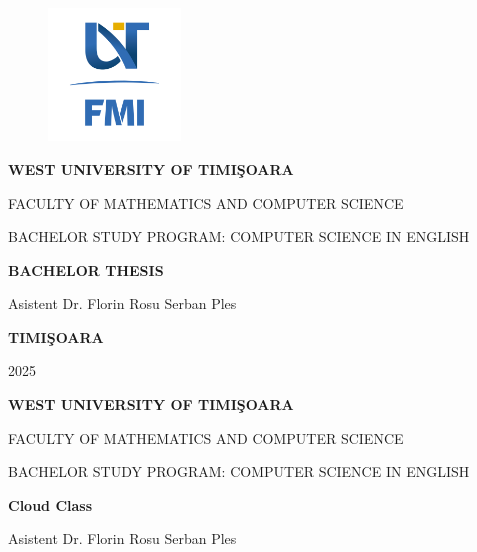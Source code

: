 \documentclass[12pt,a4paper]{book}
\theoremstyle{definition}
\theoremstyle{remark}
\begin{document}
\sloppy

\thispagestyle{empty}
\begin{center}
\begin{figure}[h!]
\vspace{-20pt}
\begin{center}
\includegraphics[width=100pt]{FMI-03.png}
\end{center}
\end{figure}


{\large{\bf WEST UNIVERSITY OF TIMI\c SOARA

FACULTY OF MATHEMATICS AND COMPUTER SCIENCE

BACHELOR STUDY PROGRAM:  COMPUTER SCIENCE IN ENGLISH  
}}

\vspace{120pt}
{\huge {\bf BACHELOR THESIS}}

\vspace{160pt}
\end{center}

{\large{}

\noindent Asistent Dr. Florin Rosu \hfill 
\noindent Serban Ples
}

\vfill
\begin{center}
{\bf TIMI\c SOARA

2025}
\end{center}
\newpage
\thispagestyle{empty}

\begin{center}
{\large{\bf WEST UNIVERSITY OF TIMI\c SOARA
		
FACULTY OF MATHEMATICS AND COMPUTER SCIENCE
		
BACHELOR STUDY PROGRAM:  COMPUTER SCIENCE IN ENGLISH}}

\vspace{200pt}
{\huge {\bf Cloud Class }}

\vspace{153pt}
\end{center}

{\large{}

\noindent Asistent Dr. Florin Rosu \hfill 
\noindent Serban Ples
}
 
\end{document}
